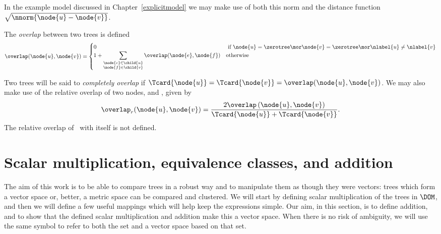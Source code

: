 In the example model discussed in Chapter~\ref{explicitmodel} we may
make use of both this norm and the distance function
$\sqrt{\nnorm{\node{u}-\node{v}}}$.

\begin{definition}
  The \emph{overlap} between two trees is defined
  \begin{equation}
  \overlap(\node{u},\node{v}) = \begin{cases}
    0 & \text{ if } \node{u} = \zerotree \mor \node{v} = \zerotree \mor \nlabel{u}\neq\nlabel{v} \\
    1 + \displaystyle\sum_{\substack{\node{e}\in\child{u} \\ \node{f}\in\child{v}}} \overlap(\node{e},\node{f}) & \text{otherwise}
  \end{cases}
  \end{equation}

  Two trees will be said to \emph{completely overlap} if
  $\Tcard{\node{u}} = \Tcard{\node{v}} = \overlap(\node{u},\node{v})$.
  We may also make use of the relative overlap of two nodes, 
  and , given by
  \[
    \overlap_{r}(\node{u},\node{v}) = \dfrac{2\overlap\left(\node{u},\node{v}\right)}{\Tcard{\node{u}}+\Tcard{\node{v}}}.
  \] The relative overlap of  \tzerotree\ with itself is
  not defined.
\end{definition}


\section{Scalar multiplication, equivalence classes, and addition}

The aim of this work is to be able to compare trees in a robust way
and to manipulate them as though they were vectors: trees which form
a vector space or, better, a metric space can be compared and
clustered. We will start by defining scalar multiplication of the trees in
$\DOM$, and then we will define a few useful mappings which will help
keep the expressions simple. Our aim, in this section, is to define
addition, and to show that the defined scalar multiplication and
addition make this a vector space. When there is no risk of ambiguity,
we will use the same symbol to refer to both the set and
a vector space based on that set.

